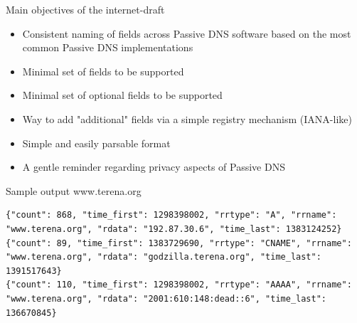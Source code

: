 \begin{frame}[t]{Main objectives of the internet-draft}
\begin{itemize}
\item Consistent naming of fields across Passive DNS software based on the most common Passive DNS implementations
\item Minimal set of fields to be supported
\item Minimal set of optional fields to be supported
\item Way to add "additional" fields via a simple registry mechanism (IANA-like)
\item Simple and easily parsable format
\item A gentle reminder regarding privacy aspects of Passive DNS
\end{itemize}
\end{frame}

\begin{frame}[t,fragile]{Sample output www.terena.org}

\lstset{breaklines=true, language=JavaScript}
\begin{lstlisting}
{"count": 868, "time_first": 1298398002, "rrtype": "A", "rrname": "www.terena.org", "rdata": "192.87.30.6", "time_last": 1383124252}
{"count": 89, "time_first": 1383729690, "rrtype": "CNAME", "rrname": "www.terena.org", "rdata": "godzilla.terena.org", "time_last": 1391517643}
{"count": 110, "time_first": 1298398002, "rrtype": "AAAA", "rrname": "www.terena.org", "rdata": "2001:610:148:dead::6", "time_last": 136670845}
\end{lstlisting}
\end{frame}


